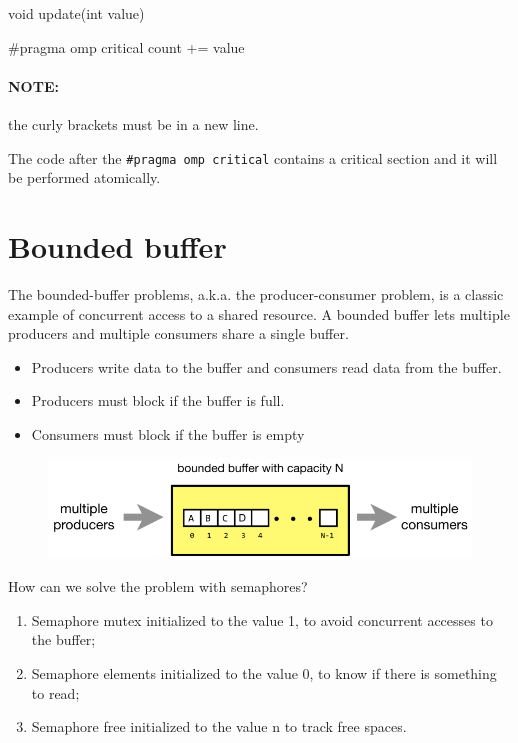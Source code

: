\begin{codeInC}
void update(int value){

    #pragma omp critical
    {
        count += value
    }
 }
\end{codeInC}

\paragraph{NOTE: } the curly brackets must be in a new line.

The code after the \verb|#pragma omp critical| contains a critical section and it will be performed atomically.


\section{Bounded buffer}

The bounded-buffer problems, a.k.a. the producer-consumer problem, is a classic example of concurrent access to a shared
resource. A bounded buffer lets multiple producers and multiple
consumers share a single buffer. 

\begin{itemize}
    \item[] Producers write data to the buffer and consumers read data from the buffer.
    \item[] Producers must block if the buffer is full.
    \item[] Consumers must block if the buffer is empty
\end{itemize}

\begin{figure}[htbp]
    \centering
    \includegraphics[width=0.5\linewidth]{img/pc_problem.png}
\end{figure}

How can we solve the problem with semaphores?

\begin{enumerate}
    \item Semaphore mutex initialized to the value 1, to avoid concurrent accesses to the buffer;
    \item Semaphore elements initialized to the value 0, to know if there is something to read;
    \item Semaphore free initialized to the value n to track free spaces.
\end{enumerate}

